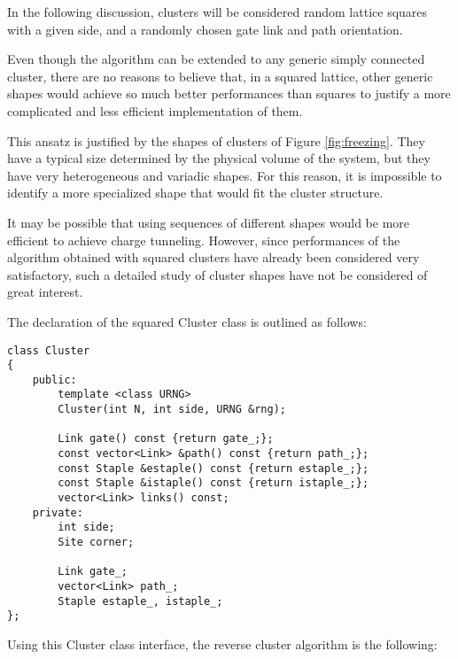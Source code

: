 In the following discussion,
clusters will be considered random lattice squares with a given side,
and a randomly chosen gate link and path orientation.

Even though the algorithm can be extended to any generic simply connected cluster,
there are no reasons to believe that, in a squared lattice,
other generic shapes would achieve so much better performances than squares
to justify a more complicated and less efficient implementation of them.

This ansatz is justified by the shapes of clusters of Figure \ref{fig:freezing}.
They have a typical size determined by the physical volume of the system,
but they have very heterogeneous and variadic shapes. 
For this reason,
it is impossible to identify a more specialized shape that would fit the cluster structure.

It may be possible that using sequences of different shapes would be more efficient to achieve charge tunneling.
However, since performances of the algorithm obtained with squared clusters have already been considered very satisfactory,
such a detailed study of cluster shapes have not be considered of great interest.

The declaration of the squared {\ttfamily Cluster} class is outlined as follows:

\begin{lstlisting}[caption={Cluster class declaration}]
class Cluster
{
    public:
        template <class URNG>
        Cluster(int N, int side, URNG &rng);

        Link gate() const {return gate_;};
        const vector<Link> &path() const {return path_;};
        const Staple &estaple() const {return estaple_;};
        const Staple &istaple() const {return istaple_;};
        vector<Link> links() const;
    private:
        int side;
        Site corner;

        Link gate_;
        vector<Link> path_;
        Staple estaple_, istaple_;
};
\end{lstlisting}

Using this {\ttfamily Cluster} class interface, the reverse cluster algorithm is the following:

